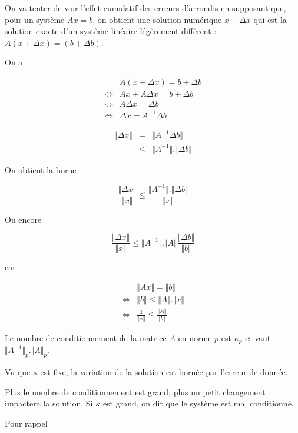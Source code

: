 	On va tenter de voir l'effet cumulatif des erreurs d'arrondis en supposant que, pour un système $Ax = b$, on obtient une solution numérique $x + \Delta x$ qui est la solution exacte d'un système linéaire légèrement différent : $A (x + \Delta x) = (b + \Delta b)$.
	
	On a
		
	\begin{eqnarray}
	& A(x + \Delta x) = b + \Delta b \\
	\Leftrightarrow & Ax + A \Delta x = b + \Delta b \\
	\Leftrightarrow & A\Delta x = \Delta b \\
	\Leftrightarrow & \Delta x = A^{-1}\Delta b
	\end{eqnarray}
	
	\begin{eqnarray}
	\Vert \Delta x  \Vert & = & \Vert A^{-1} \Delta b \Vert \\
	&  \leq & \Vert A^{-1}\Vert . \Vert \Delta b \Vert 
	\end{eqnarray}
	
	On obtient la borne
	
	$$\frac{\Vert \Delta x \Vert}{\Vert x \Vert} \leq \frac{\Vert A^{-1} \Vert . \Vert \Delta b \Vert}{\Vert x \Vert}$$
	
	Ou encore
	
	$$\frac{\Vert \Delta x \Vert}{\Vert x \Vert} \leq \Vert A^{-1} \Vert . \Vert A \Vert \frac{\Vert \Delta b \Vert}{\Vert b \Vert}$$
	
	car
	
	\begin{eqnarray}
	& \Vert Ax \Vert = \Vert b \Vert \\
	\Leftrightarrow & \Vert b \Vert \leq \Vert A \Vert . \Vert x \Vert \\
	 \Leftrightarrow & \frac{1}{\Vert x \Vert} \leq \frac{\Vert A \Vert }{\Vert b \Vert}
	\end{eqnarray}
	
	Le nombre de conditionnement de la matrice $A$ en norme $p$ est $\kappa_p$ et vaut $\Vert A^{-1} \Vert_p . \Vert A \Vert_p$.
	
	Vu que $\kappa$ est fixe, la variation de la solution est bornée par l'erreur de donnée.
	
	Plus le nombre de conditionnement est grand, plus un petit changement impactera la solution. Si $\kappa$ est grand, on dit que le système est mal conditionné.
	
	Pour rappel
	
